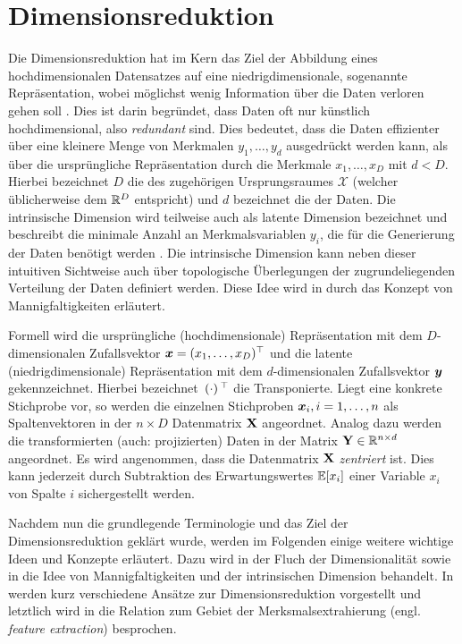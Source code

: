 \chapter{Dimensionsreduktion}
\label{ch:Dimensionsreduktion}

Die Dimensionsreduktion hat im Kern das Ziel der Abbildung eines hochdimensionalen Datensatzes auf
eine niedrigdimensionale, sogenannte  Repräsentation, wobei möglichst wenig
Information über die Daten verloren gehen soll \parencite[2]{Lee.2007}. Dies ist darin begründet, dass Daten oft nur künstlich hochdimensional, also
\textit{redundant} sind. Dies bedeutet, dass die Daten effizienter über eine kleinere Menge von
Merkmalen $y_1,\ldots,y_d$ ausgedrückt werden kann, als über die ursprüngliche Repräsentation durch
die Merkmale $x_1,\ldots,x_D$ mit $d < D$. Hierbei bezeichnet $D$ die  des zugehörigen Ursprungsraumes $\mathcal{X}$ (welcher üblicherweise dem $\mathbb{R}^D$
entspricht) und $d$ bezeichnet die  der Daten. Die intrinsische
Dimension wird teilweise auch als latente Dimension bezeichnet und beschreibt die minimale Anzahl
an Merkmalsvariablen $y_i$, die für die Generierung der Daten benötigt werden \parencite[47]{Lee.2007}. Die intrinsische Dimension kann neben dieser intuitiven Sichtweise auch über
topologische Überlegungen der zugrundeliegenden Verteilung der Daten definiert werden. Diese Idee
wird in  durch das Konzept von
Mannigfaltigkeiten erläutert.

Formell wird die ursprüngliche (hochdimensionale) Repräsentation mit dem $D$-dimensionalen
Zufallsvektor $\bm{x} = (x_1, \ldots, x_D)^\top$ und die latente (niedrigdimensionale)
Repräsentation mit dem $d$-dimensionalen Zufallsvektor $\bm{y}$ gekennzeichnet. Hierbei
bezeichnet $\,(\cdot)\,^\top$ die Transponierte. Liegt eine konkrete Stichprobe vor, so werden die
einzelnen Stichproben $\bm{x}_i, i = 1,\ldots,n$ als Spaltenvektoren in der $n \times D$
Datenmatrix $\mathbf{X}$ angeordnet. Analog dazu werden die transformierten (auch: projizierten) Daten
in der Matrix $\mathbf{Y} \in \mathbb{R}^{n \times d}$ angeordnet. Es wird angenommen, dass die Datenmatrix
$\mathbf{X}$ \textit{zentriert} ist. Dies kann jederzeit durch Subtraktion des Erwartungswertes
$\operatorname{\mathbb{E}}[x_i]$ einer Variable $x_i$ von Spalte $i$ sichergestellt werden.

Nachdem nun die grundlegende Terminologie und das Ziel der Dimensionsreduktion geklärt wurde,
werden im Folgenden einige weitere wichtige Ideen und Konzepte erläutert. Dazu wird in
 der Fluch der Dimensionalität sowie in
 die Idee von Mannigfaltigkeiten und
der intrinsischen Dimension behandelt. In  werden kurz
verschiedene Ansätze zur Dimensionsreduktion vorgestellt und letztlich wird in
 die Relation zum Gebiet der
Merksmalsextrahierung (engl. \textit{feature extraction}) besprochen.
